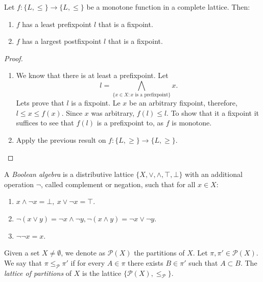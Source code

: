 \begin{theorem}
  \label{the:fixpoint}
  Let $f:\{L,\le\}\to \{L,\le\}$ be a monotone function in a complete lattice. Then:
  \begin{enumerate}
  \item $f$ has a least prefixpoint $l$ that is a fixpoint.
  \item $f$ has a largest postfixpoint $l$ that is a fixpoint.
  \end{enumerate}
\end{theorem}
\begin{proof}\hfill  \begin{enumerate}

  \item We know that there is at least a prefixpoint. Let
    $$l = \bigwedge_{\{x\in X: x\text{ is a prefixpoint}\}} x .$$ 
    Lets prove that $l$ is a fixpoint. Le $x$ be an arbitrary fixpoint, therefore, $l \le x \le f(x)$. Since $x$ was arbitrary, $f(l) \le l$. To show that it a fixpoint it suffices to see that $f(l)$ is a prefixpoint to, as $f$ is monotone.
  \item Apply the previous result on $f:\{L,\ge\}\to \{L,\ge\}$.
  \end{enumerate}
\end{proof}


\begin{definition}
  A \emph{Boolean algebra} is a distributive lattice  $\{X, \vee, \wedge, \top,\bot\}$ with an additional operation $\neg$, called complement or negation, such that for all $x\in X$:
  \begin{enumerate}
  \item $ x\wedge \neg x = \bot,\ x\vee \neg x = \top $.
  \item $ \neg(x \vee y) = \neg x \wedge \neg y,  \neg(x \wedge y) = \neg x \vee \neg y$.
  \item $\neg \neg x = x$.
  \end{enumerate}
\end{definition}




\begin{definition}
Given a set $X\ne \emptyset$, we denote as $\mathcal{P}(X)$ the partitions of $X$. Let $\pi,\pi'\in \mathcal{P}(X)$. We say that $\pi\le_{\mathcal{P}}\pi'$ if for every $A\in \pi$ there exists $B\in \pi'$ such that $A\subset B$. The \emph{lattice of partitions} of $X$ is the lattice $\{\mathcal{P}(X),\le_{\mathcal{P}}\}$.
\end{definition}

